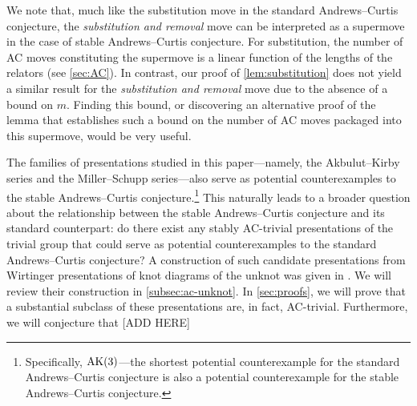 We note that, much like the substitution move in the standard Andrews--Curtis conjecture, the \emph{substitution and removal} move can be interpreted as a supermove in the case of stable Andrews--Curtis conjecture. For substitution, the number of AC moves constituting the supermove is a linear function of the lengths of the relators (see \cref{sec:AC}). In contrast, our proof of \cref{lem:substitution} does not yield a similar result for the \emph{substitution and removal} move due to the absence of a bound on $m$. Finding this bound, or discovering an alternative proof of the lemma that establishes such a bound on the number of AC moves packaged into this supermove, would be very useful.

The families of presentations studied in this paper---namely, the Akbulut--Kirby series and the Miller--Schupp series---also serve as potential counterexamples to the stable Andrews--Curtis conjecture.\footnote{Specifically, $\text{AK}(3)$---the shortest potential counterexample for the standard Andrews--Curtis conjecture is also a potential counterexample for the stable Andrews--Curtis conjecture.}
This naturally leads to a broader question about the relationship between the stable Andrews--Curtis conjecture and its standard counterpart: do there exist any stably AC-trivial presentations of the trivial group that could serve as potential counterexamples to the standard Andrews--Curtis conjecture? 
A construction of such candidate presentations from Wirtinger presentations of knot diagrams of the unknot was given in \cite{MMS}. We will review their construction in \autoref{subsec:ac-unknot}. In \autoref{sec:proofs}, we will prove that a substantial subclass of these presentations are, in fact, AC-trivial. 
Furthermore, we will conjecture that [ADD HERE]



